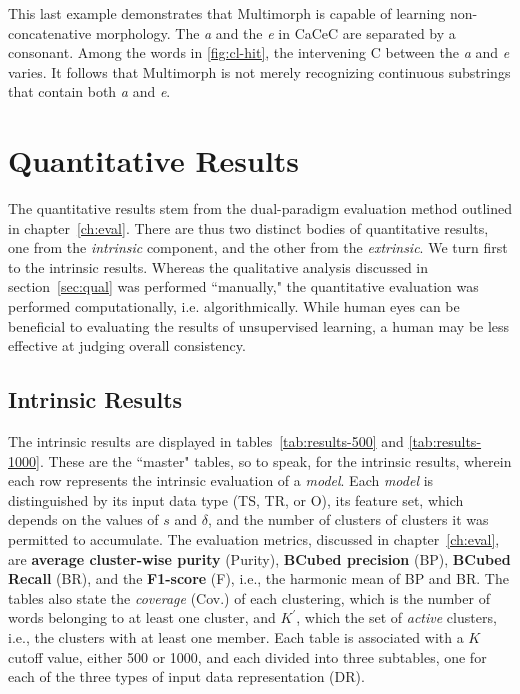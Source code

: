 This last example demonstrates that Multimorph is capable of learning non-concatenative morphology. 
The \textit{a} and the \textit{e} in CaCeC are separated by a consonant. Among the words in \ref{fig:cl-hit}, 
the intervening C between the \textit{a} and \textit{e} varies. It follows that Multimorph is not merely recognizing 
continuous substrings that contain both \textit{a} and \textit{e}.



\section{Quantitative Results}
The quantitative results stem from the dual-paradigm evaluation method outlined in chapter~\ref{ch:eval}. 
There are thus two distinct bodies of quantitative results, one from the \emph{intrinsic} component, and 
the other from the \emph{extrinsic}. We turn first to the intrinsic results.
Whereas the qualitative analysis discussed in section~\ref{sec:qual} was performed 
``manually," the quantitative evaluation was performed computationally, i.e. algorithmically. 
While human eyes can be beneficial to evaluating the results of unsupervised learning, 
a human may be less effective at judging overall consistency. 

\subsection{Intrinsic Results}
The intrinsic results are displayed in tables~\ref{tab:results-500} and \ref{tab:results-1000}. 
These are the ``master" tables, so to speak, for the intrinsic results, wherein each row 
represents the intrinsic evaluation of a \emph{model}. 
Each \emph{model} is distinguished by its input data type (TS, TR, or O), its feature set, which depends 
on the values of $s$ and $\delta$, and the number of clusters of clusters it was permitted to accumulate. 
The evaluation metrics, discussed in chapter~\ref{ch:eval}, are \textbf{average cluster-wise purity} (Purity), 
\textbf{BCubed precision} (BP), \textbf{BCubed Recall} (BR), 
and the \textbf{F1-score} (F), i.e., the harmonic mean of BP and BR.  The tables also state the \emph{coverage} 
(Cov.) of each clustering, which is the number of words belonging to at least one cluster, and $K^{\prime}$, 
which the set of \emph{active} clusters, i.e., the clusters with at least one member. 
Each table  is associated with a $K$ cutoff value, either 500 or 1000, and each divided into three subtables, 
one for each of the three types of input data representation (DR).

